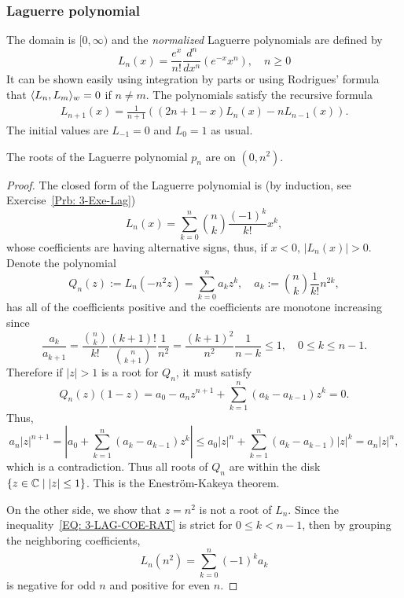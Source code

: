 \subsubsection{Laguerre polynomial}
\label{SSSec: 3-Lagu-Pol}
The domain is $[0,\infty)$ and the \emph{normalized} Laguerre polynomials are defined by 
\begin{equation}
    L_n(x) = \frac{e^x}{n!} \frac{d^n }{dx^n} (e^{-x} x^n), \quad n\ge 0
\end{equation}
It can be shown easily using integration by parts or using Rodrigues' formula that $\langle {L_n, L_m} \rangle_w = 0$ if $n\neq m$. The polynomials satisfy the recursive formula 
\begin{eqnarray}
    L_{n+1}(x) = \frac{1}{n+1}\left((2 n + 1 - x) L_n(x)-n L_{n-1}(x) \right).
\end{eqnarray}
The initial values are $L_{-1} = 0$ and $L_0=1$ as usual. 
\begin{lemma}
    The roots of the Laguerre polynomial $p_n$ are on $(0, n^2)$.
\end{lemma}
\begin{proof}
    The closed form of the Laguerre polynomial is (by induction, see Exercise~\ref{Prb: 3-Exe-Lag})
    \begin{equation}
        L_n(x) = \sum_{k=0}^n \binom{n}{k} \frac{(-1)^k}{k!} x^k,
    \end{equation}
    whose coefficients are having alternative signs, thus,  if $x < 0$, $|L_n(x)| > 0$. Denote the polynomial 
    \begin{equation}
       {Q}_n(z):=  L_n\left( -n^2 z \right) = \sum_{k=0}^n a_k z^k, \quad a_k := \binom{n}{k} \frac{1}{k!} {n^{2k}}, 
    \end{equation}
    has all of the coefficients positive and the coefficients are monotone increasing since 
    \begin{equation}\label{EQ: 3-LAG-COE-RAT}
        \frac{a_k}{a_{k+1}} = \frac{\binom{n}{k}}{k!} \frac{(k+1)!}{\binom{n}{k+1}} \frac{1}{n^2}  = \frac{(k+1)^2}{n^2} \frac{1}{n - k} \le 1,\quad 0\le k \le n- 1.
    \end{equation}
    Therefore if $|z| > 1$ is a root for $Q_n$, it must satisfy $$Q_n(z)(1-z) = a_0 - a_n z^{n+1} + \sum_{k=1}^n (a_k - a_{k-1}) z^k = 0.$$ Thus,  
    \begin{equation}
        a_n |z|^{n+1} = \left| a_0 + \sum_{k=1}^n (a_k - a_{k-1}) z^k\right| \le a_0|z|^n + \sum_{k=1}^n (a_k - a_{k-1}) |z|^k = a_n |z|^n, 
    \end{equation}
    which is a contradiction.  Thus all roots of $Q_n$ are within the disk $\{z\in \mathbb C\mid |z| \le 1\}$. This is the Enestr\"{o}m-Kakeya theorem. 

    On the other side, we show that $z = n^2$ is not a root of $L_n$. Since the inequality~\ref{EQ: 3-LAG-COE-RAT} is strict for $0\le k<n-1$, then by grouping the neighboring coefficients, 
    \begin{equation}
        L_n(n^2) = \sum_{k=0}^n (-1)^k a_k 
     \end{equation}
     is negative for odd $n$ and positive for even $n$.
\end{proof}
